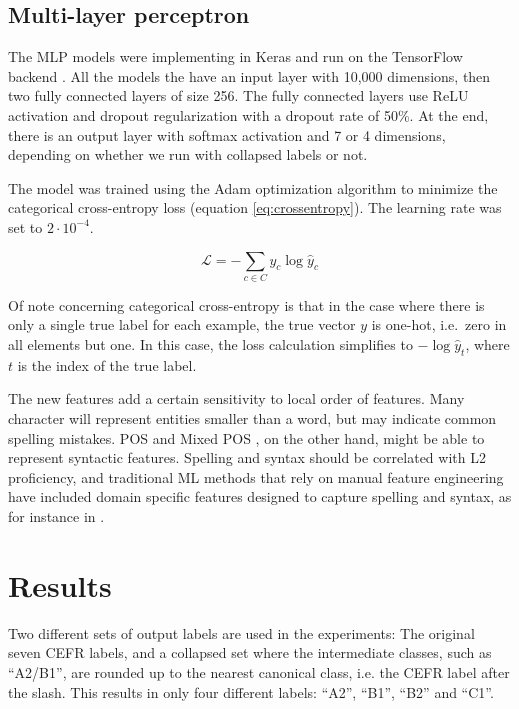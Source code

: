 \subsection{Multi-layer perceptron}
\label{subsec:mlp}

The MLP models were implementing in Keras \autocite{keras} and run on the
TensorFlow backend \autocite{tensorflow}. All the models the have an input
layer with 10,000 dimensions, then two fully connected layers of size 256.
The fully connected layers use \ac{ReLU} activation and dropout
regularization with a dropout rate of 50\%. At the end, there is an output
layer with softmax activation and 7 or 4 dimensions, depending on whether we
run with collapsed labels or not.

The model was trained using the Adam optimization algorithm
\autocite{kingma2014adam} to minimize the categorical cross-entropy loss
(equation \ref{eq:crossentropy}). The learning rate was set to $2\cdot
10^{-4}$.

\begin{equation}\label{eq:crossentropy}
  \mathcal{L} = -\sum_{c\in C} {y_c \log{{\hat y}_c}}
\end{equation}

Of note concerning categorical cross-entropy is that in the case where there
is only a single true label for each example, the true vector $y$ is one-hot,
i.e.\ zero in all elements but one. In this case, the loss calculation
simplifies to $-\log{{\hat y}_t}$, where $t$ is the index of the true label.

The new \ngram features add a certain sensitivity to local order of features.
Many character \ngrams will represent entities smaller than a word, but may
indicate common spelling mistakes. \ac{POS} and Mixed POS \ngrams, on the
other hand, might be able to represent syntactic features. Spelling and
syntax should be correlated with L2 proficiency, and traditional \ac{ML}
methods that rely on manual feature engineering have included domain specific
features designed to capture spelling and syntax, as for instance in
\textcite{vajjala17}.


\section{Results}

Two different sets of output labels are used in the experiments: The original
seven CEFR labels, and a collapsed set where the intermediate classes, such
as ``A2/B1'', are rounded up to the nearest canonical class, i.e. the CEFR
label after the slash. This results in only four different labels: ``A2'',
``B1'', ``B2'' and ``C1''.

